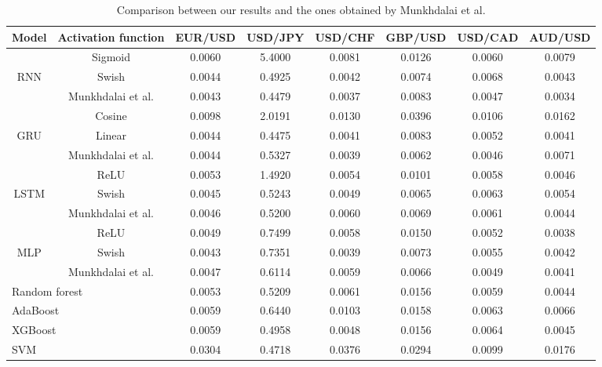 ﻿\documentclass{ieeeaccess}
\begin{document}
\begin{table}[t]
  \caption{Comparison between our results and the ones obtained by Munkhdalai et al.}
  \scriptsize
  \centering
  \begin{tabular*}{0.9\textwidth}{c @{\extracolsep{\fill}} ccccccc}
    \hline
    \textbf{Model} & \textbf{Activation function} & \textbf{EUR/USD} & \textbf{USD/JPY} & \textbf{USD/CHF} & \textbf{GBP/USD} & \textbf{USD/CAD} & \textbf{AUD/USD} \\
    \hline

          & Sigmoid & 0.0060 & 5.4000 & 0.0081 & 0.0126 & 0.0060 & 0.0079 \\
    RNN   & Swish & 0.0044 & 0.4925 & 0.0042 & 0.0074 & 0.0068 & 0.0043 \\
          & Munkhdalai et al. & 0.0043 & 0.4479 & 0.0037 & 0.0083 & 0.0047 & 0.0034 \\
    \hline
          & Cosine & 0.0098 & 2.0191 & 0.0130 & 0.0396 & 0.0106 & 0.0162 \\
    GRU   & Linear & 0.0044 & 0.4475 & 0.0041 & 0.0083 & 0.0052 & 0.0041 \\
          & Munkhdalai et al. & 0.0044 & 0.5327 & 0.0039 & 0.0062 & 0.0046 & 0.0071 \\
    \hline
          & ReLU & 0.0053 & 1.4920 & 0.0054 & 0.0101 & 0.0058 & 0.0046 \\
    LSTM  & Swish & 0.0045 & 0.5243 & 0.0049 & 0.0065 & 0.0063 & 0.0054 \\
          & Munkhdalai et al. & 0.0046 & 0.5200 & 0.0060 & 0.0069 & 0.0061 & 0.0044 \\
    \hline

          & ReLU & 0.0049 & 0.7499 & 0.0058 & 0.0150 & 0.0052 & 0.0038 \\
    MLP   & Swish & 0.0043 & 0.7351 & 0.0039 & 0.0073 & 0.0055 & 0.0042 \\
          & Munkhdalai et al. & 0.0047 & 0.6114 & 0.0059 & 0.0066 & 0.0049 & 0.0041 \\
          

    \hline

    \multicolumn{2}{l}{Random forest} & 0.0053 & 0.5209 & 0.0061 & 0.0156 & 0.0059 & 0.0044 \\
    \multicolumn{2}{l}{AdaBoost} & 0.0059 & 0.6440 & 0.0103 & 0.0158 & 0.0063 & 0.0066 \\
    \multicolumn{2}{l}{XGBoost} & 0.0059 & 0.4958 & 0.0048 & 0.0156 & 0.0064 & 0.0045 \\
    \multicolumn{2}{l}{SVM} & 0.0304 & 0.4718 & 0.0376 & 0.0294 & 0.0099 & 0.0176 \\


\end{tabular*}
\end{table}
\end{document}
